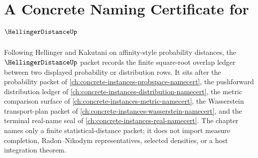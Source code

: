 \chapter{A Concrete Naming Certificate for $\HellingerDistanceUp$}
\label{ch:concrete-instances-hellinger-distance-namecert}

Following Hellinger and Kakutani on affinity-style probability distances, the $\HellingerDistanceUp$ packet records the finite square-root overlap ledger between two displayed probability or distribution rows. It sits after the probability packet of \autoref{ch:concrete-instances-probspace-namecert}, the pushforward distribution ledger of \autoref{ch:concrete-instances-distribution-namecert}, the metric comparison surface of \autoref{ch:concrete-instances-metric-namecert}, the Wasserstein transport-plan packet of \autoref{ch:concrete-instances-wasserstein-namecert}, and the terminal real-name seal of \autoref{ch:concrete-instances-real-namecert}. The chapter names only a finite statistical-distance packet; it does not import measure completion, Radon--Nikodym representatives, selected densities, or a host integration theorem.

